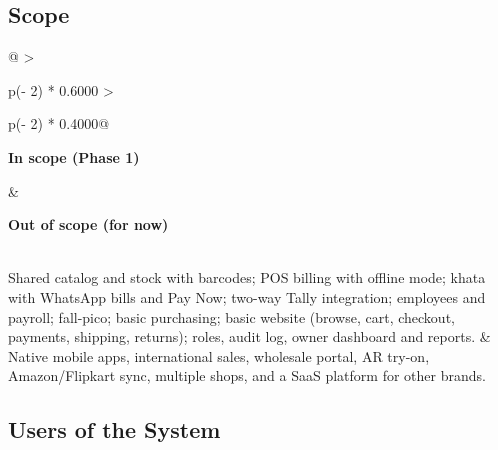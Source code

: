 \documentclass[12pt,a4paper]{article}
\providecommand{\real}[1]{#1}
\begin{document}
\subsection{Scope}\label{scope}

\begin{longtable}[]{@{}
  >{\raggedright\arraybackslash}p{(\columnwidth - 2\tabcolsep) * \real{0.6000}}
  >{\raggedright\arraybackslash}p{(\columnwidth - 2\tabcolsep) * \real{0.4000}}@{}}
\toprule\noalign{}
\begin{minipage}[b]{\linewidth}\raggedright
\textbf{In scope (Phase 1)}
\end{minipage} & \begin{minipage}[b]{\linewidth}\raggedright
\textbf{Out of scope (for now)}
\end{minipage} \\
\midrule\noalign{}
\endhead
\bottomrule\noalign{}
\endlastfoot
Shared catalog and stock with barcodes; POS billing with offline mode;
khata with WhatsApp bills and Pay Now; two-way Tally integration;
employees and payroll; fall-pico; basic purchasing; basic website
(browse, cart, checkout, payments, shipping, returns); roles, audit log,
owner dashboard and reports. & Native mobile apps, international sales,
wholesale portal, AR try-on, Amazon/Flipkart sync, multiple shops, and a
SaaS platform for other brands. \\
\end{longtable}

\subsection{Users of the System}\label{users-of-the-system}
\end{document}
